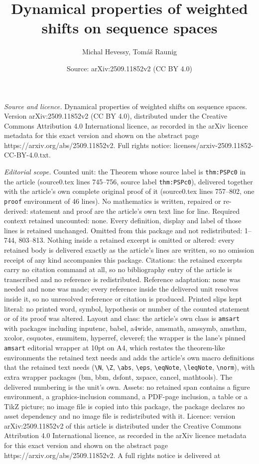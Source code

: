 \documentclass[10pt,a4paper]{amsart}
\title[Dynamical properties of weighted shifts on sequence spaces]{Dynamical properties of weighted shifts on sequence spaces}
\author{Michal Hevessy, Tom\'a\v{s} Raunig}
\date{Source: arXiv:2509.11852v2 (CC BY 4.0)}
\begin{document}
\maketitle

\noindent\emph{Source and licence.} Dynamical properties of weighted shifts on sequence spaces. Version arXiv:2509.11852v2 (CC BY 4.0), distributed under the Creative Commons Attribution 4.0 International licence, as recorded in the arXiv licence metadata for this exact version and shown on the abstract page https://arxiv.org/abs/2509.11852v2. Full rights notice: licenses/arxiv-2509.11852-CC-BY-4.0.txt.\par\smallskip

\noindent\textit{Editorial scope.} Counted unit: the Theorem whose source label is \texttt{thm:PSPc0} in the article (source0.tex lines 745--756, source label \texttt{thm:PSPc0}), delivered together with the article's own complete original proof of it (source0.tex lines 757--802, one \texttt{proof} environment of 46 lines). No mathematics is written, repaired or re-derived: statement and proof are the article's own text line for line. Required context retained uncounted: none. Every definition, display and label of those lines is retained unchanged. Omitted from this package and not redistributed: 1--744, 803--813. Nothing inside a retained excerpt is omitted or altered: every retained body is delivered exactly as the article's lines are written, so no omission receipt of any kind accompanies this package. Citations: the retained excerpts carry no citation command at all, so no bibliography entry of the article is transcribed and no reference is redistributed. Reference adaptation: none was needed and none was made; every reference inside the delivered unit resolves inside it, so no unresolved reference or citation is produced. Printed slips kept literal: no printed word, symbol, hypothesis or number of the counted statement or of its proof was altered. Layout and class: the article's own class is \texttt{amsart} with packages including inputenc, babel, a4wide, amsmath, amssymb, amsthm, xcolor, csquotes, enumitem, hyperref, cleveref; the wrapper is the lane's pinned \texttt{amsart} editorial wrapper at 10pt on A4, which restates the theorem-like environments the retained text needs and adds the article's own macro definitions that the retained text needs (\texttt{\textbackslash N}, \texttt{\textbackslash Z}, \texttt{\textbackslash abs}, \texttt{\textbackslash eps}, \texttt{\textbackslash eqNote}, \texttt{\textbackslash leqNote}, \texttt{\textbackslash norm}), with extra wrapper packages (bm, bbm, dsfont, xspace, cancel, mathtools). The delivered numbering is the unit's own. Assets: no retained span contains a figure environment, a graphics-inclusion command, a PDF-page inclusion, a table or a TikZ picture; no image file is copied into this package, the package declares no asset dependency and no image file is redistributed with it. Licence: version arXiv:2509.11852v2 of this article is distributed under the Creative Commons Attribution 4.0 International licence, as recorded in the arXiv licence metadata for this exact version and shown on the abstract page https://arxiv.org/abs/2509.11852v2. A full rights notice is delivered at 
\end{document}

